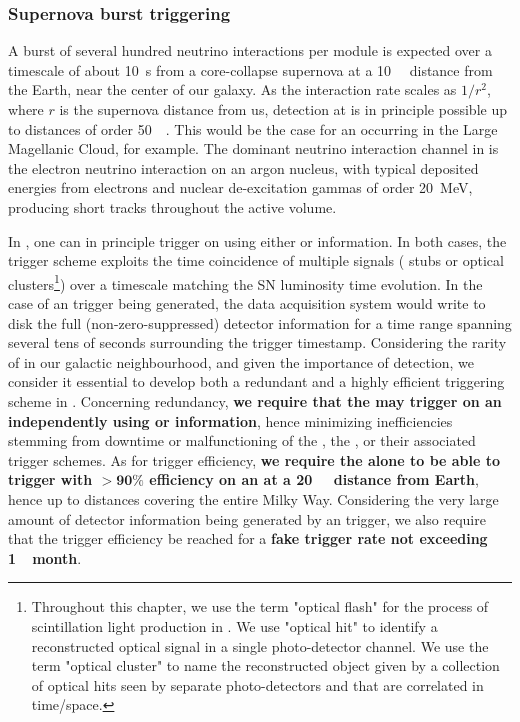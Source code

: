 \subsubsection{Supernova burst triggering}

A burst of several hundred neutrino interactions per \dune {} module is expected over a timescale of about \SI{10}{\s} from a core-collapse supernova at a \SI{10}{\kilo\parsec} distance from the Earth, near the center of our galaxy. As the  interaction rate scales as $1/r^2$, where $r$ is the supernova distance from us,  detection at \dune is in principle possible up to distances of order \SI{50}{\kilo\parsec}. This would be the case for an  occurring in the Large Magellanic Cloud, for example. The dominant neutrino interaction channel in \dune is the  electron neutrino interaction on an argon nucleus, with typical deposited energies from electrons and nuclear de-excitation gammas of order \SI{20}{\MeV}, producing short tracks throughout the  active volume.

In \dune, one can in principle trigger on  using either  or  information. In both cases, the trigger scheme exploits the time coincidence of multiple signals ( stubs or  optical clusters\footnote{Throughout this chapter, we use the term "optical flash" for the process of scintillation light production in . We use "optical hit" to identify a reconstructed optical signal in a single photo-detector channel. We use the term "optical cluster" to name the reconstructed object given by a collection of optical hits seen by separate photo-detectors and that are correlated in time/space.}) over a timescale matching the SN luminosity time evolution. In the case of an  trigger being generated, the data acquisition system would write to disk the full (non-zero-suppressed) detector information for a time range spanning several tens of seconds surrounding the trigger timestamp. Considering the rarity of  in our galactic neighbourhood, and given the importance of  detection, we consider it essential to develop both a redundant and a highly efficient  triggering scheme in . Concerning redundancy, {\bf we require that the \dune {} may trigger on an  independently using  or  information}, hence minimizing  inefficiencies stemming from downtime or malfunctioning of the , the , or their associated trigger schemes. As for trigger efficiency, {\bf we require the  alone to be able to trigger with $\boldsymbol{>90\%}$ efficiency on an  at a \SI{20}{\kilo\parsec} distance from Earth}, hence up to distances covering the entire Milky Way. Considering the very large amount of detector information being generated by an  trigger, we also require that the  trigger efficiency be reached for a {\bf fake trigger rate not exceeding \SI{1}{\per month}}.

